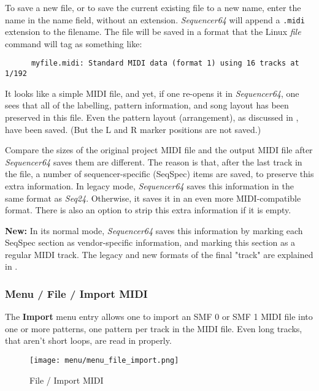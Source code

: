    To save a new file, or to save the current existing file to a new name,
   enter the name in the name field, without an extension.
   \textsl{Sequencer64} will append a \texttt{.midi} extension to the filename.
   The file will be saved in a format that the Linux \textsl{file} command
   will tag as something like:

   \begin{verbatim}
      myfile.midi: Standard MIDI data (format 1) using 16 tracks at 1/192
   \end{verbatim}

   It looks like a simple MIDI file, and yet, if one re-opens it in
   \textsl{Sequencer64}, one sees that all of the labelling, pattern information,
   and song layout has been preserved in this file.
   Even the pattern layout (arrangement), as discussed in
   ,
   have been saved.
   (But the L and R marker positions are not saved.)

   Compare the sizes of the original project MIDI file
   and the output MIDI file after \textsl{Sequencer64} saves them
   are different.
   The reason is that, after the last track in the file, a number of
   sequencer-specific (SeqSpec) items are saved, to preserve this extra
   information.  In legacy mode, \textsl{Sequencer64} saves this information
   in the same format as \textsl{Seq24}. Otherwise, it saves it
   in an even more MIDI-compatible format.  There is also an option to strip
   this extra information if it is empty.

   \textbf{New:}
   In its normal mode, \textsl{Sequencer64} saves this
   information by marking each SeqSpec section
   as vendor-specific information, and marking this section as a regular
   MIDI track.
   The legacy and new formats of the final "track" are explained in
   .

\subsubsection{Menu / File / Import MIDI}
\label{subsubsec:seq64_menu_file_import}

   The \textbf{Import} menu entry allows one to import an SMF 0
   or SMF 1 MIDI file into one or more patterns, one pattern per track in
   the MIDI file.  Even long tracks, that aren't short loops, are read in
   properly.

\begin{figure}[H]
   \centering 
   \texttt{[image: menu/menu\_file\_import.png]}
   \caption{File / Import MIDI}
   \label{fig:seq64_menu_file_import}
\end{figure}

